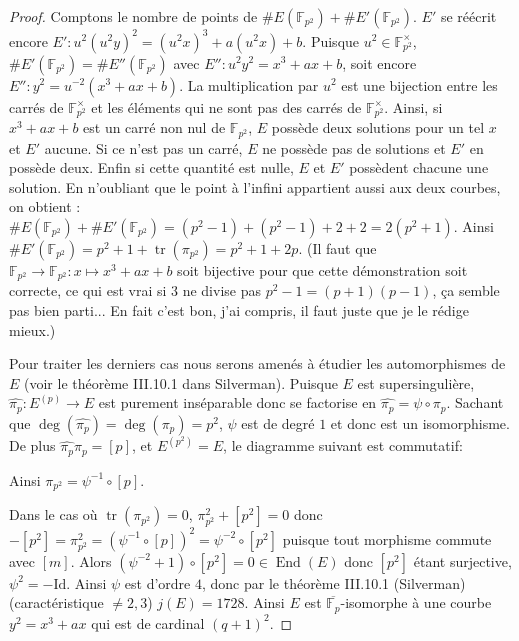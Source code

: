 \documentclass{article}
\theoremstyle{plain}%
\theoremstyle{definition}%
\newcommand{\F}{\mathbb{F}}
\DeclareMathOperator{\End}{End}
\DeclareMathOperator{\tr}{tr}
\begin{document}
\begin{proof}
      Comptons le nombre de points de $\#E(\F_{p^2}) + \#E'(\F_{p^2})$. $E'$ se réécrit encore $E' : u^2 (u^2 y)^2 = (u^2 x)^3 + a (u^2 x) + b$. Puisque $u^2\in \F_{p^2}^\times$, $\#E'(\F_{p^2}) = \#E''(\F_{p^2})$ avec $E'' : u^2 y^2 = x^3 + a x + b$, soit encore $E'' : y^2 = u^{-2} (x^3 + ax + b)$.
      La multiplication par $u^2$ est une bijection entre les carrés de $\F_{p^2}^\times$ et les éléments qui ne sont pas des carrés de $\F_{p^2}^\times$. 
      Ainsi, si $x^3 + ax + b$ est un carré non nul de $\F_{p^2}$, $E$ possède deux solutions pour un tel $x$ et $E'$ aucune. Si ce n'est pas un carré, $E$ ne possède pas de solutions et $E'$ en possède deux. Enfin si cette quantité est nulle, $E$ et $E'$ possèdent chacune une solution. En n'oubliant que le point à l'infini appartient aussi aux deux courbes, on obtient :
      $ \#E(\F_{p^2}) + \#E'(\F_{p^2}) = (p^2 - 1) + (p^2 -1) + 2 + 2 = 2(p^2 + 1)$. Ainsi $\#E'(\F_{p^2}) = p^2 + 1 + \tr(\pi_{p^2}) = p^2 + 1 + 2p$. 
      {\color{red} (Il faut que $\F_{p^2} \to \F_{p^2} : x \mapsto x^3 + ax +b$ soit bijective pour que cette démonstration soit correcte, ce qui est vrai si $3$ ne divise pas $p^2 - 1=(p+1)(p-1)$, ça semble pas bien parti... En fait c'est bon, j'ai compris, il faut juste que je le rédige mieux.)}

\vspace{1em}
Pour traiter les derniers cas nous serons amenés à étudier les automorphismes de $E$ (voir le théorème III.10.1 dans Silverman). Puisque $E$ est supersingulière, $\widehat{\pi_p} : E^{(p)} \to E$ est purement inséparable donc se factorise en  $\widehat{\pi_p} = \psi \circ \pi_p$. Sachant que $\deg(\widehat{\pi_p}) = \deg(\pi_p) = p^2$, $\psi$ est de degré $1$ et donc est un isomorphisme. De plus $\widehat{\pi_p}\pi_p = [p]$, et $E^{(p^2)} = E$, le diagramme suivant est commutatif: 

\begin{center}
\end{center}
Ainsi $\pi_{p^2} = \psi^{-1} \circ [p]$.

\vspace{1em}
Dans le cas où $\tr(\pi_{p^2}) = 0$, $\pi_{p^2}^2 + [p^2] = 0$ donc $-[p^2] = \pi_{p^2}^2 = (\psi^{-1} \circ [p])^2 = \psi^{-2} \circ [p^2]$ puisque tout morphisme commute avec $[m]$. Alors $(\psi^{-2} +1)\circ [p^2] = 0\in \End(E)$ donc $[p^2]$ étant surjective, $\psi^2 = -\text{Id}$.
Ainsi $\psi$ est d'ordre $4$, donc par le théorème III.10.1 (Silverman) (caractéristique $\neq 2, 3$) $j(E) = 1728$.
Ainsi $E$ est $\overline{\F_p}$-isomorphe à une courbe $y^2=x^3 + ax$ qui est de cardinal $(q+1)^2$.


\end{proof}
\end{document}
